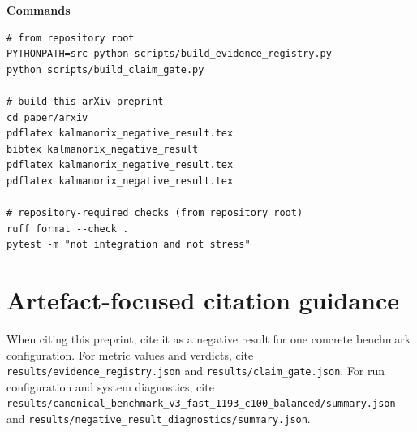 \documentclass[11pt]{article}
\begin{document}
\textbf{Commands}
\begin{verbatim}
# from repository root
PYTHONPATH=src python scripts/build_evidence_registry.py
python scripts/build_claim_gate.py

# build this arXiv preprint
cd paper/arxiv
pdflatex kalmanorix_negative_result.tex
bibtex kalmanorix_negative_result
pdflatex kalmanorix_negative_result.tex
pdflatex kalmanorix_negative_result.tex

# repository-required checks (from repository root)
ruff format --check .
pytest -m "not integration and not stress"
\end{verbatim}

\section{Artefact-focused citation guidance}
When citing this preprint, cite it as a negative result for one concrete benchmark configuration. For metric values and verdicts, cite \texttt{results/evidence\_registry.json} and \texttt{results/claim\_gate.json}. For run configuration and system diagnostics, cite \texttt{results/canonical\_benchmark\_v3\_fast\_1193\_c100\_balanced/summary.json} and \texttt{results/negative\_result\_diagnostics/summary.json}.



\end{document}
